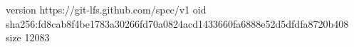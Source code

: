 version https://git-lfs.github.com/spec/v1
oid sha256:fd8cab8f4be1783a30266fd70a0824acd1433660fa6888e52d5dfdfa8720b408
size 12083
